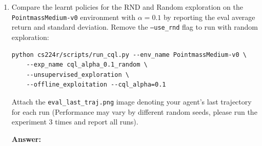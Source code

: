 \documentclass[12pt]{article}
\newcommand{\answer}[1]{{\bf \color{red}Answer:\\ #1}}
\begin{document}
\begin{enumerate}
\item Compare the learnt policies for the RND and Random exploration on the \\ \texttt{PointmassMedium-v0} environment with $\alpha=0.1$ by reporting the eval average return and standard deviation. 
Remove the \texttt{--use\_rnd} flag to run with random exploration:

\begin{tcolorbox}[width=\linewidth, sharp corners=all, colback=white!95!black]
\begin{verbatim}
python cs224r/scripts/run_cql.py --env_name PointmassMedium-v0 \
    --exp_name cql_alpha_0.1_random \
    --unsupervised_exploration \
    --offline_exploitation --cql_alpha=0.1
\end{verbatim}
\end{tcolorbox}


Attach the \texttt{eval\_last\_traj.png} image denoting your agent's last trajectory for each run (Performance may vary by different random seeds, please run the experiment 3 times and report all runs).




\answer{}
\end{enumerate}
\end{document}
